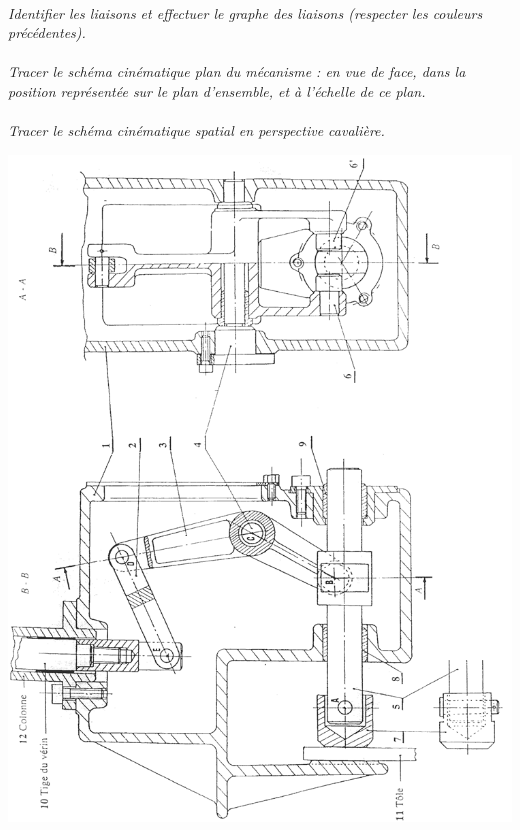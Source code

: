 \documentclass[11pt,oneside]{article}
\begin{document}
\paragraph{}
\textit{Identifier les liaisons et effectuer le graphe des liaisons (respecter les couleurs précédentes).}

\paragraph{}
\textit{Tracer le schéma cinématique plan  du mécanisme : en vue de face, dans la position représentée sur le plan d’ensemble, et à l’échelle de ce plan.}

\paragraph{}
\textit{Tracer le schéma cinématique spatial  en perspective cavalière.}

\begin{center}
\includegraphics[width=\textwidth]{png/plan}
\end{center}
\end{document}
